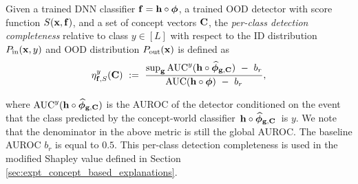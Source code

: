 \begin{definition}
\label{def:completeness_detec_perclass}
Given a trained DNN classifier $\mathbf{f} = \mathbf{h} \circ \bm{\phi}$, a trained OOD detector with score function $S(\mathbf{x}, \mathbf{f})$, and a set of concept vectors $\mathbf{C}$, the {\em per-class detection completeness} relative to class $y \in [L]$ with respect to the ID distribution $P_{\textrm{in}}(\mathbf{x}, y)$ and OOD distribution $P_{\textrm{out}}(\mathbf{x})$ is defined as
\begin{align}
\label{equ: completeness-detection-perclass}
    \eta^{y}_{\mathbf{f}, S}(\mathbf{C}) 
    ~:=~ \frac{\textrm{sup}_{\mathbf{g}} \,\textrm{AUC}^y(\mathbf{h} \circ \widehat{\bm{\phi}}_{\mathbf{g}, \mathbf{C}}) ~-~ b_r}{\textrm{AUC}(\mathbf{h} \circ \bm{\phi}) ~-~ b_r},
\end{align}
\end{definition}
where $\textrm{AUC}^y(\mathbf{h} \circ \widehat{\bm{\phi}}_{\mathbf{g}, \mathbf{C}})$ is the AUROC of the detector conditioned on the event that the class predicted by the concept-world classifier $\,\mathbf{h} \circ \widehat{\bm{\phi}}_{\mathbf{g}, \mathbf{C}}\,$ is $y$. We note that the denominator in the above metric is still the global AUROC. The baseline AUROC $b_r$ is equal to $0.5$.
This per-class detection completeness is used in the modified Shapley value defined in Section \ref{sec:expt_concept_based_explanations}.

